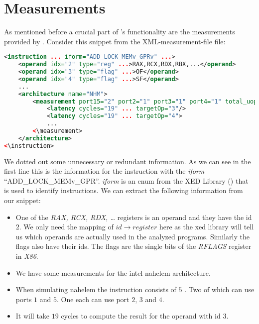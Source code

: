  
 

\section{Measurements}
\label{sec:measurements}

As mentioned before a crucial part of \suaca's functionality are the measurements provided by \cite{Andreas}. Consider this snippet from the XML-measurement-file file:


\begin{lstlisting}[language=XML, basicstyle=\ttfamily\scriptsize, breaklines=false]
<instruction ... iform="ADD_LOCK_MEMv_GPRv" ...>
    <operand idx="2" type="reg" ...>RAX,RCX,RDX,RBX,...</operand>
    <operand idx="3" type="flag" ...>OF</operand>
    <operand idx="4" type="flag" ...>SF</operand>
    ...
    <architecture name="NHM">
        <measurement port15="2" port2="1" port3="1" port4="1" total_uops="5">
            <latency cycles="19" ... targetOp="3"/>
            <latency cycles="19" ... targetOp="4">
            ...
        <\measurement>
    </architecture>
<\instruction>
\end{lstlisting}

We dotted out some unnecessary or redundant information. As we can see in the first line this is the information for the instruction with the \emph{iform} ``ADD\_LOCK\_MEMv\_GPR''. \emph{iform} is an enum from the XED Library (\cite{xed}) that is used to identify instructions. We can extract the following information from our snippet:

\begin{itemize}
    \item One of the \emph{RAX, RCX, RDX, \dots} registers is an operand and they have the id $2$. We only need the mapping of $id \rightarrow register$ here as the xed library will tell us which operands are actually used in the analyzed programs. Similarly the flags also have their ids. The flags are the single bits of the \emph{RFLAGS} register in \emph{X86}.
    \item We have some measurements for the intel nahelem architecture.
    \item When simulating nahelem the instruction consists of $5$ \microops. Two of which can use ports $1$ and $5$. One each can use port $2$, $3$ and $4$.
    \item It will take $19$ cycles to compute the result for the operand with id $3$.
\end{itemize}

